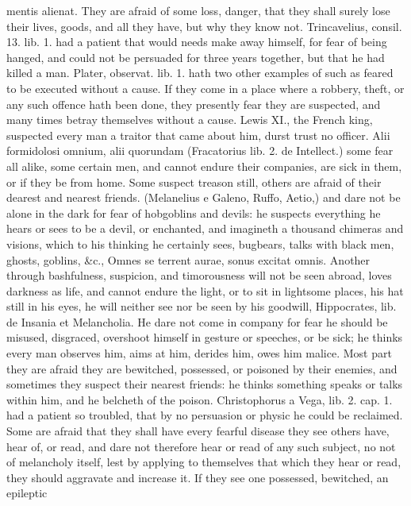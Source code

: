 {mentis alienat. They are afraid of some loss, danger, that they shall
surely lose their lives, goods, and all they have, but why they know
not. Trincavelius, consil. 13. lib. 1. had a patient that would needs
make away himself, for fear of being hanged, and could not be persuaded
for three years together, but that he had killed a man. Plater,
observat. lib. 1. hath two other examples of such as feared to be
executed without a cause. If they come in a place where a robbery,
theft, or any such offence hath been done, they presently fear they are
suspected, and many times betray themselves without a cause. Lewis XI.,
the French king, suspected every man a traitor that came about him,
durst trust no officer. Alii formidolosi omnium, alii quorundam
(Fracatorius lib. 2. de Intellect.) some fear all alike, some
certain men, and cannot endure their companies, are sick in them, or if
they be from home. Some suspect treason still, others are afraid
of their dearest and nearest friends. (Melanelius e Galeno,
Ruffo, Aetio,) and dare not be alone in the dark for fear of hobgoblins
and devils: he suspects everything he hears or sees to be a devil, or
enchanted, and imagineth a thousand chimeras and visions, which to his
thinking he certainly sees, bugbears, talks with black men, ghosts,
goblins, \&c., Omnes se terrent aurae, sonus excitat omnis.
Another through bashfulness, suspicion, and timorousness will not be
seen abroad, loves darkness as life, and cannot endure the light,
or to sit in lightsome places, his hat still in his eyes, he will
neither see nor be seen by his goodwill, Hippocrates, lib. de Insania
et Melancholia. He dare not come in company for fear he should be
misused, disgraced, overshoot himself in gesture or speeches, or be
sick; he thinks every man observes him, aims at him, derides him, owes
him malice. Most part they are afraid they are bewitched,
possessed, or poisoned by their enemies, and sometimes they suspect
their nearest friends: he thinks something speaks or talks within him,
and he belcheth of the poison. Christophorus a Vega, lib. 2. cap. 1.
had a patient so troubled, that by no persuasion or physic he could be
reclaimed. Some are afraid that they shall have every fearful disease
they see others have, hear of, or read, and dare not therefore hear or
read of any such subject, no not of melancholy itself, lest by applying
to themselves that which they hear or read, they should aggravate and
increase it. If they see one possessed, bewitched, an epileptic
}
